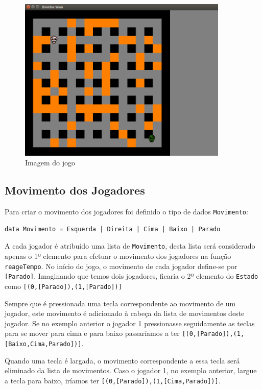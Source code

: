 \documentclass[a4paper]{article}
\begin{document}
\begin{figure}[h]
 \centering
 \includegraphics[width=10cm]{jogo}
 \caption{Imagem do jogo}
 \label{im.jogo}
\end{figure}

\subsection{Movimento dos Jogadores}
\label{movimento}
Para criar o movimento dos jogadores foi definido o tipo de dados \texttt{Movimento}:

\begin{verbatim}
data Movimento = Esquerda | Direita | Cima | Baixo | Parado
\end{verbatim}

A cada jogador é atribuído uma lista de \texttt{Movimento}, desta lista será considerado
apenas o 1º elemento para efetuar o movimento dos jogadores na função \texttt{reageTempo}.
No início do jogo, o movimento de cada jogador define-se por \texttt{[Parado]}.
Imaginando que temos dois jogadores, ficaria o 2º elemento do \texttt{Estado} como
\texttt{[(0,[Parado]),(1,[Parado])]}

Sempre que é pressionada uma tecla correspondente ao movimento de um jogador,
este movimento é adicionado à cabeça da lista de movimentos deste jogador.
Se no exemplo anterior o jogador 1 pressionasse seguidamente as teclas para se mover
para cima e para baixo passaríamos a ter \texttt{[(0,[Parado]),(1,[Baixo,Cima,Parado])]}.

Quando uma tecla é largada, o movimento correspondente a essa tecla será eliminado da
lista de movimentos. Caso o jogador 1, no exemplo anterior, largue a tecla para baixo,
iríamos ter \texttt{[(0,[Parado]),(1,[Cima,Parado])]}.
\end{document}
